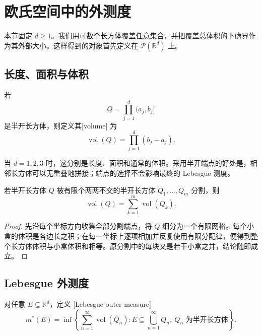 \section{欧氏空间中的外测度}
\label{b1:sec:0301}

本节固定 \(d\geq1\)。我们用可数个长方体覆盖任意集合，并把覆盖总体积的下确界作为其外部大小。这样得到的对象首先定义在 \(\mathcal P(\mathbb R^d)\) 上。

\subsection{长度、面积与体积}
\label{b1:subsec:030101}

\begin{definition}
\label{b1:def:rectangle-volume}
若
\[
Q=\prod_{j=1}^{d}(a_j,b_j]
\]
是半开长方体，则定义其[volume] 为
\[
\operatorname{vol}(Q)=\prod_{j=1}^{d}(b_j-a_j).
\]
\end{definition}

当 \(d=1,2,3\) 时，这分别是长度、面积和通常的体积。采用半开端点的好处是，相邻长方体可以无重叠地拼接；端点的选择不会影响最终的 Lebesgue 测度。

\begin{proposition}
\label{b1:prop:rectangle-additivity}
若半开长方体 \(Q\) 被有限个两两不交的半开长方体 \(Q_1,\ldots,Q_m\) 分割，则
\[
\operatorname{vol}(Q)=\sum_{k=1}^{m}\operatorname{vol}(Q_k).
\]
\end{proposition}
\begin{proof}
先沿每个坐标方向收集全部分割端点，将 \(Q\) 细分为一个有限网格。每个小盒的体积是各边长之积；在每一坐标上逐项相加并反复使用有限分配律，便得到整个长方体体积与小盒体积和相等。原分割中的每块又是若干小盒之并，结论随即成立。
\end{proof}

\subsection{Lebesgue 外测度}
\label{b1:subsec:030102}

\begin{definition}
\label{b1:def:lebesgue-outer-measure}
对任意 \(E\subseteq\mathbb R^d\)，定义 [Lebesgue outer measure]
\[
m^*(E)
=\inf\left\{
\sum_{n=1}^{\infty}\operatorname{vol}(Q_n):
E\subseteq\bigcup_{n=1}^{\infty}Q_n,\
Q_n\text{ 为半开长方体}
\right\}.
\]
\end{definition}

